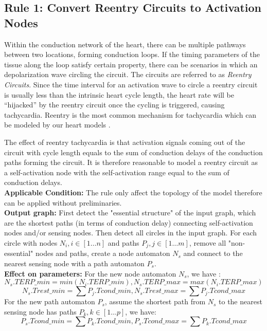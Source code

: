 \subsection{Rule 1: Convert Reentry Circuits to Activation Nodes}
Within the conduction network of the heart, there can be multiple pathways between two locations, forming conduction loops. If the timing parameters of the tissue along the loop satisfy certain property, there can be scenarios in which an depolarization wave circling the circuit. The circuits are referred to as \emph{Reentry Circuits}. Since the time interval for an activation wave to circle a reentry circuit is usually less than the intrinsic heart cycle length, the heart rate will be "`hijacked"' by the reentry circuit once the cycling is triggered, causing tachycardia. Reentry is the most common mechanism for tachycardia which can be modeled by our heart models \cite{vhm_embc10}. 

The effect of reentry tachycardia is that activation signals coming out of the circuit with cycle length equals to the sum of conduction delays of the conduction paths forming the circuit. It is therefore reasonable to model a reentry circuit as a self-activation node with the self-activation range equal to the sum of conduction delays. \\
\textbf{Applicable Condition: } The rule only affect the topology of the model therefore can be applied without preliminaries.\\
\textbf{Output graph: }First detect the "essential structure" of the input graph, which are the shortest paths (in terms of conduction delay) connecting self-activation nodes and/or sensing nodes. Then detect all circles in the input graph. For each circle with nodes $N_i,i\in[1\dots n]$ and paths $P_j,j\in[1\dots m]$, remove all "non-essential" nodes and paths, create a node automaton $N_s$ and connect to the nearest sensing node with a path automaton $P_s$.\\
\textbf{Effect on parameters: }For the new node automaton $N_s$, we have :
$$N_s.TERP\_min=min(N_i.TERP\_min), N_s.TERP\_max=max(N_i.TERP\_max)$$
$$N_s.Trest\_min=\sum P_j.Tcond\_min,N_s.Trest\_max=\sum P_j.Tcond\_max$$
For the new path automaton $P_s$, assume the shortest path from $N_s$ to the nearest sensing node has paths $P_k,k\in[1\dots p]$, we have:
$$P_s.Tcond\_min=\sum P_k.Tcond\_min,P_s.Tcond\_max=\sum P_k.Tcond\_max$$
